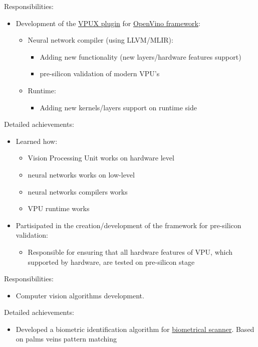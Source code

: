 \documentclass[a4paper,11pt]{memoir}
\begin{document}
{
Responsibilities:
\begin{itemize}
	\item Development of the \href{https://github.com/openvinotoolkit/vpux-plugin}{VPUX plugin} for \href{https://github.com/openvinotoolkit/openvino}{OpenVino framework}:
	\begin{itemize}
		\item Neural network compiler (using LLVM/MLIR):
		\begin{itemize}
			\item Adding new functionality (new layers/hardware features support)
			\item pre-silicon validation of modern VPU's
		\end{itemize}
		\item Runtime:
		\begin{itemize}
			\item Adding new kernels/layers support on runtime side
		\end{itemize}
	\end{itemize}	
\end{itemize}
Detailed achievements:
\begin{itemize}
	\item Learned how:
	\begin{itemize} 
		\item Vision Processing Unit works on hardware level
		\item neural networks works on low-level
		\item neural networks compilers works
		\item VPU runtime works
	\end{itemize}
	\item Partisipated in the creation/development of the framework for pre-silicon validation:
	\begin{itemize}
		\item Responsible for ensuring that all hardware features of VPU, which supported by hardware, are tested on pre-silicon stage
	\end{itemize}
\end{itemize}
}

{
Responsibilities:
\begin{itemize}
	\item Computer vision algorithms development.
\end{itemize}
Detailed achievements:
\begin{itemize}
	\item Developed a biometric identification algorithm for \href{https://en.kalashnikovgroup.ru/media/perspektivnye-razrabotki/kontsern-kalashnikov-predstavil-sobstvennyy-biometricheskiy-skaner}{biometrical scanner}. Based on palms veins pattern matching
\end{itemize}
}
\end{document}
